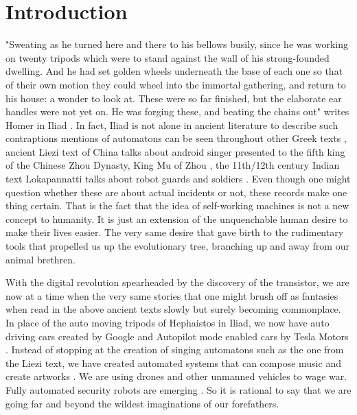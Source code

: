 \section{Introduction}
\label{sec:-intro}
"Sweating as he turned here and there to his bellows busily, since he was working on twenty tripods which were to stand against the wall of his strong-founded dwelling. And he had set golden wheels underneath the base of each one so that of their own motion they could wheel into the immortal gathering, and return to his house: a wonder to look at. These were so far finished, but the elaborate ear handles were not yet on. He was forging these, and beating the chains out" writes Homer in Iliad \cite{homer1194iliad}. In fact, Iliad is not alone in ancient literature to describe such contraptions mentions of  automatons can be seen throughout other Greek texts \cite{aaron2015automatones}, ancient Liezi text of China talks about android singer presented to the fifth king of the Chinese Zhou Dynasty, King Mu of Zhou \cite{lie600liezi}, the 11th/12th century Indian text Lokapannatti talks about robot guards and soldiers \cite{sarah1997lokapannatti}. Even though one might question whether these are about actual incidents or not, these records make one thing certain. That is the fact that the idea of self-working machines is not a new concept to humanity. It is just an extension of the unquenchable human desire to make their lives easier. The very same desire that gave birth to the rudimentary tools that propelled us up the evolutionary tree, branching up and away from our animal brethren. 

With the digital revolution spearheaded by the discovery of the transistor, we are now at a time when the very same stories that one might brush off as fantasies when read in the above ancient texts slowly but surely becoming commonplace. In place of the auto moving tripods of Hephaistos in Iliad, we now have auto driving cars created by Google \cite{google2016car} and Autopilot mode enabled cars by Tesla Motors \cite{tesla2016car}. Instead of stopping at the creation of singing automatons such as the one from the Liezi text, we have created automated systems that can compose music \cite{liu2014bach} and create artworks \cite{james2016art}. We are using drones and other unmanned vehicles to wage war. Fully automated security robots are emerging \cite{justin2016security}. So it is rational to say that we are going far and beyond the wildest imaginations of our forefathers. 

